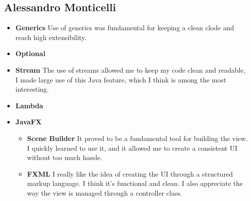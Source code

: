 \subsection {Alessandro Monticelli}
\begin{itemize}
    \item \textbf{Generics} Use of generics was fundamental for keeping a clean clode and reach high extensibility.
    \item \textbf{Optional}
    \item \textbf{Stream} The use of streams allowed me to keep my code clean and readable, I made large use of this Java feature, 
                            which I think is among the most interesting.
    \item \textbf{Lambda}
    \item \textbf{JavaFX}
        \begin{itemize}
            \item \textbf{Scene Builder} It proved to be a fundamental tool for building the view. I quickly learned to use it, 
                                            and it allowed me to create a consistent UI without too much hassle.
            \item \textbf{FXML} I really like the idea of creating the UI through a structured markup language. I think it's functional and clean.
                                I also appreciate the way the view is managed through a controller class.
        \end{itemize}
\end{itemize}